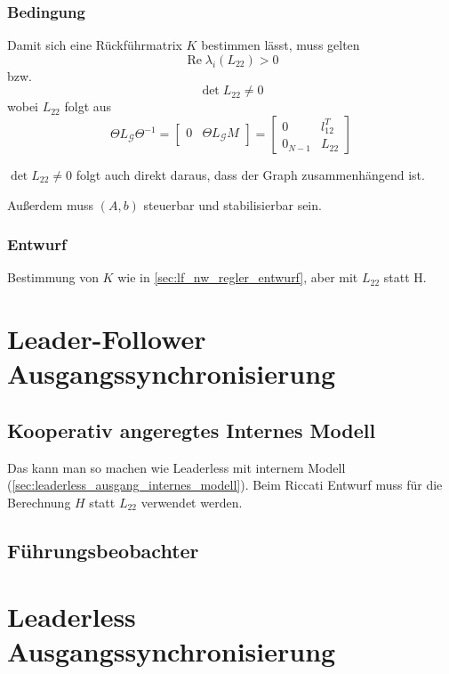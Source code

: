 \subsubsection{Bedingung}
Damit sich eine Rückführmatrix $K$ bestimmen lässt, muss gelten
\begin{equation}
    \operatorname{Re} \lambda_i(L_{22}) > 0
\end{equation}
bzw.
\begin{equation}
    \det L_{22} \neq 0
\end{equation}
wobei $L_{22}$ folgt aus
\begin{equation}
    \Theta L_\mathcal{G} \Theta^{-1} = \begin{bmatrix}
        0 & \Theta L_\mathcal{G}M
    \end{bmatrix}
    = \begin{bmatrix}
        0 & l_{12}^T \\
        0_{N-1} & L_{22}
    \end{bmatrix}
\end{equation}

$\det L_{22} \neq 0$ folgt auch direkt daraus, dass der Graph zusammenhängend ist.

Außerdem muss $(A,b)$ steuerbar und stabilisierbar sein.

\subsubsection{Entwurf}
Bestimmung von $K$ wie in \ref{sec:lf_nw_regler_entwurf},
aber mit $L_{22}$ statt H.


\pagebreak
\section{Leader-Follower Ausgangssynchronisierung}
\subsection{Kooperativ angeregtes Internes Modell}
Das kann man so machen wie Leaderless mit internem Modell
(\ref{sec:leaderless_ausgang_internes_modell}).
Beim Riccati Entwurf muss für die Berechnung $H$ statt $L_{22}$ verwendet
werden.

\subsection{Führungsbeobachter}

\pagebreak
\section{Leaderless Ausgangssynchronisierung}
\label{sec:leaderless_ausgang}
